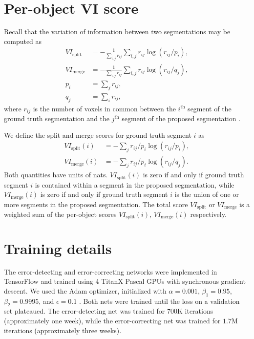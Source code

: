 \section{Per-object VI score}
\label{appendix:vi}
 Recall that the variation of information between two segmentations may be computed as
\begin{align*}
	VI_\text{split}&=-\frac 1 {\sum_{i,j} r_{ij}} \sum_{i,j} r_{ij} \log\left(r_{ij}/p_i\right),\\
	VI_\text{merge}&=-\frac 1 {\sum_{i,j} r_{ij}} \sum_{i,j} r_{ij} \log\left(r_{ij}/q_j\right),\\
	p_i&=\sum_j r_{ij},\\
	q_j&=\sum_i r_{ij},
\end{align*}
where $r_{ij}$ is the number of voxels in common between the $i^\text{th}$ segment of the ground truth segmentation and the $j^\text{th}$ segment of the proposed segmentation \cite{vi}.

We define the split and merge scores for ground truth segment $i$ as
\begin{align*}
	VI_\text{split}(i) &= -\sum_j r_{ij}/p_i \log(r_{ij}/p_i),\\
	VI_\text{merge}(i) &= -\sum_j r_{ij}/p_i \log(r_{ij}/q_j).
\end{align*}
Both quantities have units of nats. $VI_\text{split}(i)$ is zero if and only if
ground truth segment $i$ is contained within a segment in the proposed
segmentation, while $VI_\text{merge}(i)$ is zero if and only if ground truth
segment $i$ is the union of one or more segments in the proposed segmentation.
The total score $VI_\text{split}$ or $VI_\text{merge}$ is a weighted sum of the
per-object scores $VI_\text{split}(i)$, $VI_\text{merge}(i)$ respectively.


\section{Training details} The error-detecting and error-correcting networks
were implemented in TensorFlow \cite{tensorflow} and trained using 4 TitanX
Pascal GPUs with synchronous gradient descent. We used the Adam optimizer,
initialized with $\alpha=0.001$, $\beta_1=0.95$, $\beta_2=0.9995$, and
$\epsilon=0.1$ \cite{adam}.   Both nets were trained until the loss on a
validation set plateaued. The error-detecting net was trained for $700$K
iterations (approximately one week), while the error-correcting net was trained
for $1.7$M iterations (approximately three weeks).
